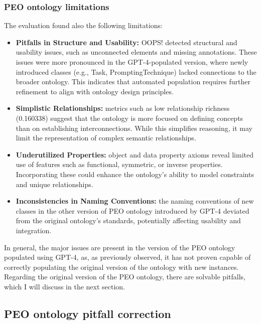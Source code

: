 \subsubsection{PEO ontology limitations}
The evaluation found also the following limitations:
\begin{itemize}
    \item \textbf{Pitfalls in Structure and Usability:} OOPS! detected structural and usability issues, such as unconnected elements and missing annotations. These issues were more pronounced in the GPT-4-populated version, where newly introduced classes (e.g., Task, PromptingTechnique) lacked connections to the broader ontology. This indicates that automated population requires further refinement to align with ontology design principles.

    \item \textbf{Simplistic Relationships:} metrics such as low relationship richness (0.160338) suggest that the ontology is more focused on defining concepts than on establishing interconnections. While this simplifies reasoning, it may limit the representation of complex semantic relationships.

    \item \textbf{Underutilized Properties:} object and data property axioms reveal limited use of features such as functional, symmetric, or inverse properties. Incorporating these could enhance the ontology's ability to model constraints and unique relationships.

    \item \textbf{Inconsistencies in Naming Conventions:} the naming conventions of new classes in the other version of PEO ontology introduced by GPT-4 deviated from the original ontology’s standards, potentially affecting usability and integration.
\end{itemize}
In general, the major issues are present in the version of the PEO ontology populated using GPT-4, as, as previously observed, it has not proven capable of correctly populating the original version of the ontology with new instances. Regarding the original version of the PEO ontology, there are solvable pitfalls, which I will discuss in the next section.

\subsection{PEO ontology pitfall correction}

